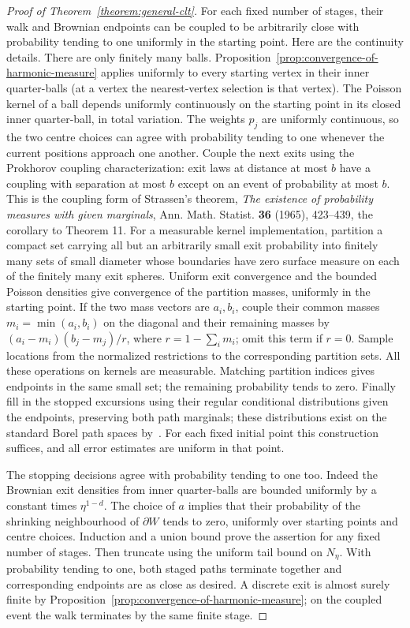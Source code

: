 \documentclass[12pt]{amsart}
\numberwithin{equation}{section}
\begin{document}
\begin{proof}[Proof of Theorem~\ref{theorem:general-clt}]
For each fixed number of stages, their walk and Brownian endpoints can be coupled to be arbitrarily close with probability tending to one uniformly in the starting point. Here are the continuity details. There are only finitely many balls. Proposition~\ref{prop:convergence-of-harmonic-measure} applies uniformly to every starting vertex in their inner quarter-balls (at a vertex the nearest-vertex selection is that vertex). The Poisson kernel of a ball depends uniformly continuously on the starting point in its closed inner quarter-ball, in total variation. The weights $p_j$ are uniformly continuous, so the two centre choices can agree with probability tending to one whenever the current positions approach one another. Couple the next exits using the Prokhorov coupling characterization: exit laws at distance at most $b$ have a coupling with separation at most $b$ except on an event of probability at most $b$.
This is the coupling form of Strassen's theorem, \emph{The existence of probability measures with given marginals}, Ann. Math. Statist. \textbf{36} (1965), 423--439, the corollary to Theorem 11. For a measurable kernel implementation, partition a compact set carrying all but an arbitrarily small exit probability into finitely many sets of small diameter whose boundaries have zero surface measure on each of the finitely many exit spheres. Uniform exit convergence and the bounded Poisson densities give convergence of the partition masses, uniformly in the starting point. If the two mass vectors are $a_i,b_i$, couple their common masses $m_i=\min(a_i,b_i)$ on the diagonal and their remaining masses by $(a_i-m_i)(b_j-m_j)/r$, where $r=1-\sum_i m_i$; omit this term if $r=0$. Sample locations from the normalized restrictions to the corresponding partition sets. All these operations on kernels are measurable. Matching partition indices gives endpoints in the same small set; the remaining probability tends to zero. Finally fill in the stopped excursions using their regular conditional distributions given the endpoints, preserving both path marginals; these distributions exist on the standard Borel path spaces by~\cite[Theorem 8.5]{MR4226142}. For each fixed initial point this construction suffices, and all error estimates are uniform in that point.

The stopping decisions agree with probability tending to one too. Indeed the Brownian exit densities from inner quarter-balls are bounded uniformly by a constant times $\eta^{1-d}$. The choice of $a$ implies that their probability of the shrinking neighbourhood of $\partial W$ tends to zero, uniformly over starting points and centre choices. Induction and a union bound prove the assertion for any fixed number of stages. Then truncate using the uniform tail bound on $N_\eta$. With probability tending to one, both staged paths terminate together and corresponding endpoints are as close as desired. A discrete exit is almost surely finite by Proposition~\ref{prop:convergence-of-harmonic-measure}; on the coupled event the walk terminates by the same finite stage.


\end{proof}
\end{document}
